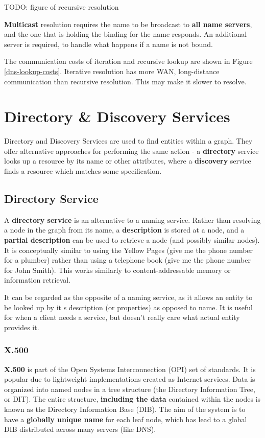 \documentclass{article}
\begin{document}
TODO: figure of recursive resolution

\textbf{Multicast} resolution requires the name to be broadcast to \textbf{all name servers}, and the one that is holding the binding for the name responds. An additional server is required, to handle what happens if a name is not bound. 

The communication costs of iteration and recursive lookup are shown in Figure \ref{dns-lookup-costs}. Iterative resolution has more WAN, long-distance communication than recursive resolution. This may make it slower to resolve.

\section{Directory \& Discovery Services}

Directory and Discovery Services are used to find entities within a graph. They offer alternative approaches for performing the same action - a \textbf{directory} service looks up a resource by its name or other attributes, where a \textbf{discovery} service finds a resource which matches some specification. 


\subsection{Directory Service}

A \textbf{directory service} is an alternative to a naming service. Rather than resolving a node in the graph from its name, a \textbf{description} is stored at a node, and a \textbf{partial description} can be used to retrieve a node (and possibly similar nodes). It is conceptually similar to using the Yellow Pages (give me the phone number for a plumber) rather than using a telephone book (give me the phone number for John Smith). This works similarly to content-addressable memory or information retrieval.

It can be regarded as the opposite of a naming service, as it allows an entity to be looked up by it s description (or properties) as opposed to name. It is useful for when a client needs a service, but doesn't really care what actual entity provides it.

\subsubsection{X.500}

\textbf{X.500} is part of the Open Systems Interconnection (OPI) set of standards. It is popular due to lightweight implementations created as Internet services. Data is organized into named nodes in a tree structure (the Directory Information Tree, or DIT). The entire structure, \textbf{including the data} contained within the nodes is known as the Directory Information Base (DIB). The aim of the system is to have a \textbf{globally unique name} for each leaf node, which has lead to a global DIB distributed across many servers (like DNS). 
\end{document}
